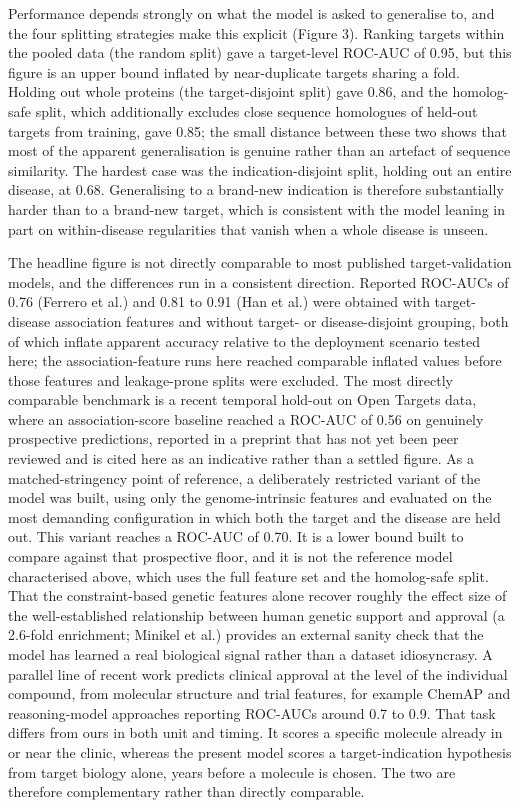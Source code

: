 \documentclass[11pt,twocolumn]{article}
\begin{document}
Performance depends strongly on what the model is asked to generalise to, and the four splitting strategies make this explicit (Figure 3). Ranking targets within the pooled data (the random split) gave a target-level ROC-AUC of 0.95, but this figure is an upper bound inflated by near-duplicate targets sharing a fold. Holding out whole proteins (the target-disjoint split) gave 0.86, and the homolog-safe split, which additionally excludes close sequence homologues of held-out targets from training, gave 0.85; the small distance between these two shows that most of the apparent generalisation is genuine rather than an artefact of sequence similarity. The hardest case was the indication-disjoint split, holding out an entire disease, at 0.68. Generalising to a brand-new indication is therefore substantially harder than to a brand-new target, which is consistent with the model leaning in part on within-disease regularities that vanish when a whole disease is unseen.

The headline figure is not directly comparable to most published target-validation models, and the differences run in a consistent direction. Reported ROC-AUCs of 0.76 (Ferrero et al.\cite{ref29}) and 0.81 to 0.91 (Han et al.\cite{ref31}) were obtained with target-disease association features and without target- or disease-disjoint grouping, both of which inflate apparent accuracy relative to the deployment scenario tested here; the association-feature runs here reached comparable inflated values before those features and leakage-prone splits were excluded. The most directly comparable benchmark is a recent temporal hold-out on Open Targets data, where an association-score baseline reached a ROC-AUC of 0.56 on genuinely prospective predictions,\cite{ref34} reported in a preprint that has not yet been peer reviewed and is cited here as an indicative rather than a settled figure. As a matched-stringency point of reference, a deliberately restricted variant of the model was built, using only the genome-intrinsic features and evaluated on the most demanding configuration in which both the target and the disease are held out. This variant reaches a ROC-AUC of 0.70. It is a lower bound built to compare against that prospective floor, and it is not the reference model characterised above, which uses the full feature set and the homolog-safe split. That the constraint-based genetic features alone recover roughly the effect size of the well-established relationship between human genetic support and approval (a 2.6-fold enrichment; Minikel et al.\cite{ref22}) provides an external sanity check that the model has learned a real biological signal rather than a dataset idiosyncrasy. A parallel line of recent work predicts clinical approval at the level of the individual compound, from molecular structure and trial features, for example ChemAP and reasoning-model approaches reporting ROC-AUCs around 0.7 to 0.9. That task differs from ours in both unit and timing. It scores a specific molecule already in or near the clinic, whereas the present model scores a target-indication hypothesis from target biology alone, years before a molecule is chosen. The two are therefore complementary rather than directly comparable.
\end{document}
